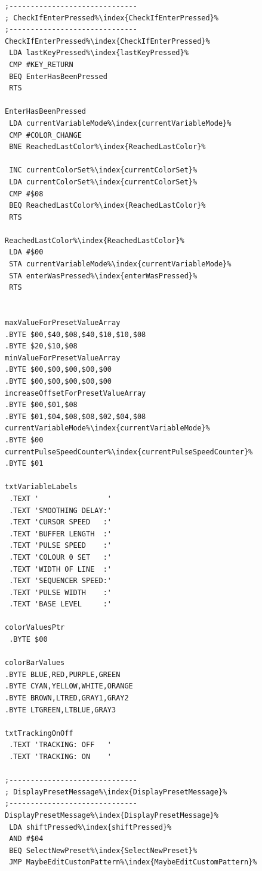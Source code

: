 \begin{minipage}[b]{0.33\linewidth}
\begin{lrbox}{\mybox}%
\begin{lstlisting}[basicstyle=\ttfamily\tiny,escapechar=\%]
;------------------------------
; CheckIfEnterPressed%\index{CheckIfEnterPressed}%
;------------------------------
CheckIfEnterPressed%\index{CheckIfEnterPressed}%
 LDA lastKeyPressed%\index{lastKeyPressed}%
 CMP #KEY_RETURN
 BEQ EnterHasBeenPressed
 RTS

EnterHasBeenPressed
 LDA currentVariableMode%\index{currentVariableMode}%
 CMP #COLOR_CHANGE
 BNE ReachedLastColor%\index{ReachedLastColor}%

 INC currentColorSet%\index{currentColorSet}%
 LDA currentColorSet%\index{currentColorSet}%
 CMP #$08
 BEQ ReachedLastColor%\index{ReachedLastColor}%
 RTS

ReachedLastColor%\index{ReachedLastColor}%
 LDA #$00
 STA currentVariableMode%\index{currentVariableMode}%
 STA enterWasPressed%\index{enterWasPressed}%
 RTS


maxValueForPresetValueArray       
.BYTE $00,$40,$08,$40,$10,$10,$08
.BYTE $20,$10,$08
minValueForPresetValueArray       
.BYTE $00,$00,$00,$00,$00
.BYTE $00,$00,$00,$00,$00
increaseOffsetForPresetValueArray 
.BYTE $00,$01,$08
.BYTE $01,$04,$08,$08,$02,$04,$08
currentVariableMode%\index{currentVariableMode}%               
.BYTE $00
currentPulseSpeedCounter%\index{currentPulseSpeedCounter}%          
.BYTE $01

txtVariableLabels
 .TEXT '                '
 .TEXT 'SMOOTHING DELAY:'
 .TEXT 'CURSOR SPEED   :'
 .TEXT 'BUFFER LENGTH  :'
 .TEXT 'PULSE SPEED    :'
 .TEXT 'COLOUR 0 SET   :'
 .TEXT 'WIDTH OF LINE  :'
 .TEXT 'SEQUENCER SPEED:'
 .TEXT 'PULSE WIDTH    :'
 .TEXT 'BASE LEVEL     :'

colorValuesPtr
 .BYTE $00

colorBarValues  
.BYTE BLUE,RED,PURPLE,GREEN
.BYTE CYAN,YELLOW,WHITE,ORANGE
.BYTE BROWN,LTRED,GRAY1,GRAY2
.BYTE LTGREEN,LTBLUE,GRAY3

txtTrackingOnOff
 .TEXT 'TRACKING: OFF   '
 .TEXT 'TRACKING: ON    '

;------------------------------
; DisplayPresetMessage%\index{DisplayPresetMessage}%
;------------------------------
DisplayPresetMessage%\index{DisplayPresetMessage}%
 LDA shiftPressed%\index{shiftPressed}%
 AND #$04
 BEQ SelectNewPreset%\index{SelectNewPreset}%
 JMP MaybeEditCustomPattern%\index{MaybeEditCustomPattern}%


\end{lstlisting}
\end{lrbox}
\end{minipage}
